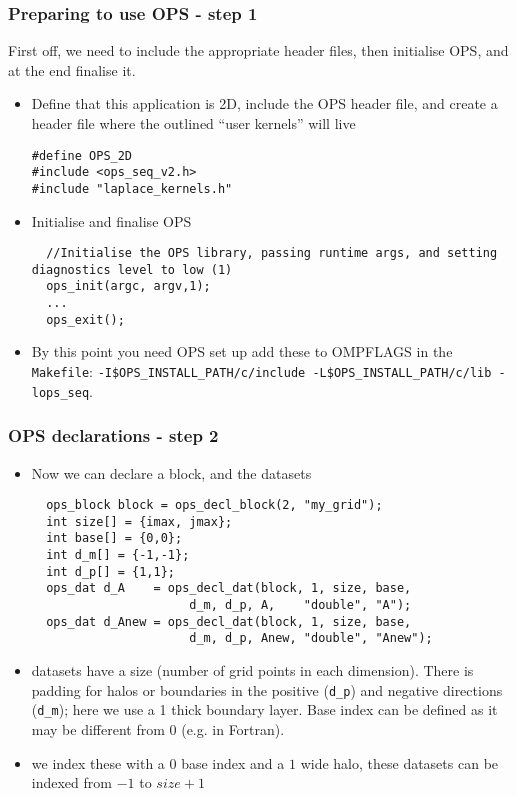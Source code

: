 \documentclass{beamer}
\begin{document}
\begin{frame}[fragile]
\frametitle{Preparing to use OPS - step 1}
First off, we need to include the appropriate header files, then initialise OPS, and at the end finalise it.
\begin{itemize}
\item Define that this application is 2D, include the OPS header file, and create a header file where the outlined ``user kernels'' will live
\begin{lstlisting}
#define OPS_2D
#include <ops_seq_v2.h>
#include "laplace_kernels.h"
\end{lstlisting}
\item Initialise and finalise OPS
\begin{lstlisting}
  //Initialise the OPS library, passing runtime args, and setting diagnostics level to low (1)
  ops_init(argc, argv,1);
  ...
  ops_exit();
\end{lstlisting}
\item By this point you need OPS set up add these to OMPFLAGS in the \texttt{Makefile}: \texttt{-I\$OPS\_INSTALL\_PATH/c/include -L\$OPS\_INSTALL\_PATH/c/lib -lops\_seq}.
\end{itemize}
\end{frame}


\begin{frame}[fragile]
\frametitle{OPS declarations - step 2}
\begin{itemize}
\item Now we can declare a block, and the datasets
\begin{lstlisting}
  ops_block block = ops_decl_block(2, "my_grid");
  int size[] = {imax, jmax};
  int base[] = {0,0};
  int d_m[] = {-1,-1};
  int d_p[] = {1,1};
  ops_dat d_A    = ops_decl_dat(block, 1, size, base,
                      d_m, d_p, A,    "double", "A");
  ops_dat d_Anew = ops_decl_dat(block, 1, size, base,
                      d_m, d_p, Anew, "double", "Anew");
  \end{lstlisting}
  \item datasets have a size (number of grid points in each dimension). There is padding for halos or boundaries in the positive (\texttt{d\_p}) and negative directions (\texttt{d\_m}); here we use a 1 thick boundary layer. Base index can be defined as it may be different from 0 (e.g. in Fortran). 
  \item we index these with a $0$ base index and a $1$ wide halo, these datasets can be indexed from $-1$ to $size+1$
\end{itemize}
\end{frame}
\end{document}
